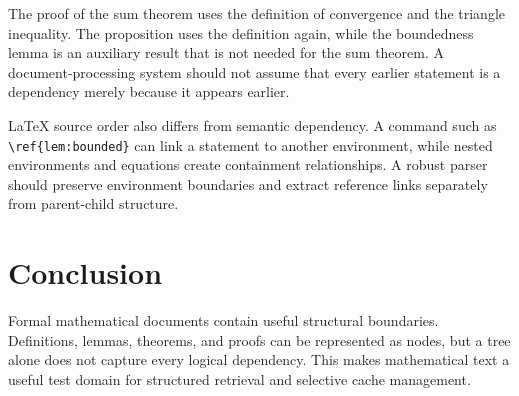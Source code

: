 \documentclass{article}
\begin{document}
The proof of the sum theorem uses the definition of convergence and the
triangle inequality. The proposition uses the definition again, while
the boundedness lemma is an auxiliary result that is not needed for the
sum theorem. A document-processing system should not assume that every
earlier statement is a dependency merely because it appears earlier.

LaTeX source order also differs from semantic dependency. A command such
as \verb|\ref{lem:bounded}| can link a statement to another environment,
while nested environments and equations create containment relationships.
A robust parser should preserve environment boundaries and extract
reference links separately from parent-child structure.

\section{Conclusion}

Formal mathematical documents contain useful structural boundaries.
Definitions, lemmas, theorems, and proofs can be represented as nodes,
but a tree alone does not capture every logical dependency. This makes
mathematical text a useful test domain for structured retrieval and
selective cache management.
\end{document}
